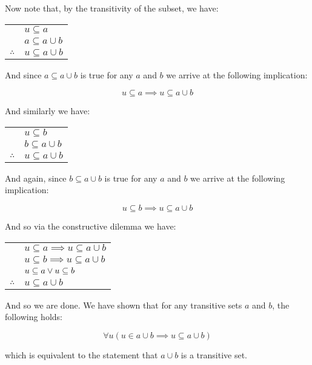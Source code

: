 \documentclass{article}
\begin{document}
Now note that, by the transitivity of the subset, we have:

\begin{center}
    \begin{tabular}{c@{\,}l@{}} 
        & $u\subseteq a$ \\
        & $a\subseteq a\cup b$ \\
        \cline{2-2}
    $\therefore$         & $u\subseteq a\cup b$
    \end{tabular}
\end{center}

And since $a\subseteq a\cup b$ is true for any $a$ and $b$ we arrive at the following implication:

$$u\subseteq a\implies u\subseteq a\cup b$$

And similarly we have:

\begin{center}
    \begin{tabular}{c@{\,}l@{}} 
        & $u\subseteq b$ \\
        & $b\subseteq a\cup b$ \\
        \cline{2-2}
    $\therefore$         & $u\subseteq a\cup b$
    \end{tabular}
\end{center}

And again, since $b\subseteq a\cup b$ is true for any $a$ and $b$ we arrive at the following implication:

$$u\subseteq b\implies u\subseteq a\cup b$$

And so via the constructive dilemma we have:

\begin{center}
    \begin{tabular}{c@{\,}l@{}} 
        & $u\subseteq a\implies u\subseteq a\cup b$ \\
        & $u\subseteq b\implies u\subseteq a\cup b$ \\
        & $u\subseteq a\vee u\subseteq b$ \\
        \cline{2-2}
    $\therefore$         & $u\subseteq a\cup b$ \\
    \end{tabular}
\end{center}

And so we are done. We have shown that for any transitive sets $a$ and $b$, the following holds: 

$$\forall u(u\in a\cup b\implies u\subseteq a\cup b)$$

which is equivalent to the statement that $a\cup b$ is a transitive set.
\bigskip
\end{document}
